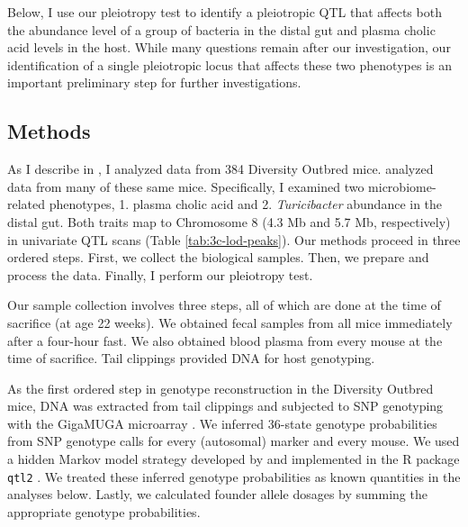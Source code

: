 \documentclass[oneside]{book}\usepackage[]{graphicx}\usepackage[]{color}
\begin{document}
Below, I use our pleiotropy test to identify a pleiotropic QTL that affects both the 
abundance level of a group of bacteria in the distal gut and plasma cholic acid levels in the host. 
While many questions remain after our investigation, 
our identification of a single pleiotropic locus that affects these two phenotypes 
is an important preliminary step for further investigations.



\subsection{Methods}

As I describe in \citet{kemis2019genetic}, I analyzed data from 384 Diversity Outbred mice.
\citet{keller2018genetic} analyzed data from many of these same mice. 
Specifically, I examined two microbiome-related phenotypes, 1. plasma cholic acid and 
2. \emph{Turicibacter} abundance in the distal gut. 
Both traits map to Chromosome 8 (4.3 Mb and 5.7 Mb, respectively) in 
univariate QTL scans (Table \ref{tab:3c-lod-peaks}).
Our methods proceed in three ordered steps. 
First, we collect the biological samples. 
Then, we prepare and process the data. 
Finally, I perform our pleiotropy test.

Our sample collection involves three steps, all of which are done at the time of sacrifice (at age 22 weeks). 
We obtained fecal samples from all mice immediately 
after a four-hour fast. 
We also obtained blood plasma from every mouse at the time of sacrifice. 
Tail clippings provided DNA for host genotyping.


As the first ordered step in genotype reconstruction in the Diversity Outbred mice, DNA was extracted from tail clippings and subjected to SNP genotyping with the GigaMUGA microarray \citep{morgan2015mouse}. 
We inferred 36-state genotype probabilities from SNP genotype calls for every (autosomal) 
marker and every mouse. 
We used a hidden Markov model strategy developed by 
\citet{broman2012genotype, broman2012haplotype} and implemented in 
the R package \texttt{qtl2} \citep{broman2019rqtl2}. 
We treated these inferred 
genotype probabilities as known quantities in the analyses below. 
Lastly, we calculated founder allele dosages by summing the appropriate 
genotype probabilities. 
\end{document}
